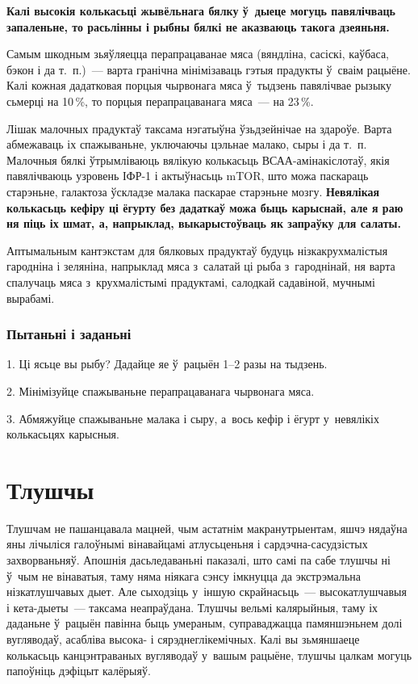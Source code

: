\textbf{Калі высокія колькасьці жывёльнага бялку ў~дыеце могуць павялічваць запаленьне, то расьлінны і рыбны бялкі не аказваюць такога дзеяньня.}

Самым шкодным зьяўляецца перапрацаванае мяса (вяндліна, сасіскі, каўбаса, бэкон і да т.~п.)~--- варта гранічна мінімізаваць гэтыя прадукты ў~сваім рацыёне. Калі кожная дадатковая порцыя чырвонага мяса ў~тыдзень павялічвае рызыку сьмерці на 10\,\%, то порцыя перапрацаванага мяса~--- на 23\,\%.

Лішак малочных прадуктаў таксама нэгатыўна ўзьдзейнічае на здароўе. Варта абмежаваць іх спажываньне, уключаючы цэльнае малако, сыры і да т.~п. Малочныя бялкі ўтрымліваюць вялікую колькасьць ВСАА-амінакіслотаў, якія павялічваюць узровень ІФР-1 і актыўнасьць mTOR, што можа паскараць старэньне, галактоза ўскладзе малака паскарае старэньне мозгу. \textbf{Невялікая колькасьць кефіру ці ёгурту без дадаткаў можа быць карыснай, але я раю ня піць іх шмат, а, напрыклад, выкарыстоўваць як запраўку для салаты.}

Аптымальным кантэкстам для бялковых прадуктаў будуць нізкакрухмалістыя гародніна і зеляніна, напрыклад мяса з~салатай ці рыба з~гароднінай, ня варта спалучаць мяса з~крухмалістымі прадуктамі, салодкай садавіной, мучнымі вырабамі.

\subsubsection{Пытаньні і заданьні}

1. Ці ясьце вы рыбу? Дадайце яе ў~рацыён 1--2 разы на тыдзень.

2. Мінімізуйце спажываньне перапрацаванага чырвонага мяса.

3. Абмяжуйце спажываньне малака і сыру, а~вось кефір і ёгурт у~невялікіх колькасьцях карысныя.


\section{Тлушчы}

Тлушчам не пашанцавала мацней, чым астатнім макранутрыентам, яшчэ нядаўна яны лічыліся галоўнымі вінавайцамі атлусьценьня і сардэчна-сасудзістых захворваньняў. Апошнія дасьледаваньні паказалі, што самі па сабе тлушчы ні ў~чым не вінаватыя, таму няма ніякага сэнсу імкнуцца да экстрэмальна нізкатлушчавых дыет. Але сыходзіць у~іншую скрайнасьць~--- высокатлушчавыя і кета-дыеты~--- таксама неапраўдана. Тлушчы вельмі калярыйныя, таму іх даданьне ў~рацыён павінна быць умераным, суправаджацца памяншэньнем долі вугляводаў, асабліва высока- і сярэднеглікемічных. Калі вы зьмяншаеце колькасьць канцэнтраваных вугляводаў у~вашым рацыёне, тлушчы цалкам могуць папоўніць дэфіцыт калёрыяў.

